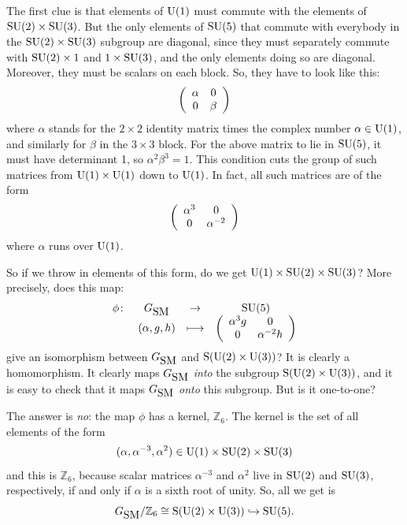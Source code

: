 \documentclass[12pt]{article}
\newcommand{\maps}{\colon}    %
\newcommand{\Z}{{\mathbb Z}}  %
\newcommand{\U}{{\rm U}}    %
\renewcommand{\S}{{\rm S}}    %
\newcommand{\SU}{{\rm SU}}    %
\newcommand{\inclusion}{\hookrightarrow}
\newcommand{\GSM}{{G_{\mbox{\rm SM}}}}  %
\begin{document}
The first clue is that elements of $\U(1)$ must commute with the
elements of $\SU(2) \times \SU(3)$.  But the only elements of $\SU(5)$
that commute with everybody in the $\SU(2) \times \SU(3)$ subgroup are
diagonal, since they must separately commute with $\SU(2) \times 1$
and $1 \times \SU(3)$, and the only elements doing so are
diagonal. Moreover, they must be scalars on each block.  So, they have
to look like this:
\[
\left( 
\begin{array}{c c}
\alpha & 0 \\
0      & \beta
\end{array}
\right)
\]
where $\alpha$ stands for the $2 \times 2$ identity matrix times
the complex number $\alpha \in \U(1)$, and similarly for $\beta$ in the
$3 \times 3$ block.  For the above matrix to lie in $\SU(5)$, it
must have determinant 1, so $\alpha^2 \beta^3 = 1$.  This condition 
cuts the group of such matrices from $\U(1) \times \U(1)$ down to 
$\U(1)$. In fact, all such matrices are of the form
\[
\left( 
\begin{array}{c c}
\alpha^3 & 0 \\
0        & \alpha^{-2}
\end{array}
\right)
\]
where $\alpha$ runs over $\U(1)$.

So if we throw in elements of this form, do we get $\U(1) \times
\SU(2) \times \SU(3)$?  More precisely, does this map:
\[ \begin{array}{rccc}
  \phi \maps & \GSM &\to& \SU(5) \\   
             & (\alpha, g, h) &\longmapsto& 
\left( 
\begin{array}{c c}
\alpha^{3}g & 0 \\
0           & \alpha^{-2}h
\end{array}
\right)
\end{array}
\]
give an isomorphism between $\GSM$ and $\S(\U(2) \times \U(3))$?
It is clearly a homomorphism.  It clearly maps 
$\GSM$ \emph{into} the subgroup $\S(\U(2) \times \U(3))$, and 
it is easy to check that it maps $\GSM$ \emph{onto} this subgroup.
But is it one-to-one?

The answer is \emph{no}: the map $\phi$ has a kernel, $\Z_6$.  
The kernel is the set of all elements of the form
\[ (\alpha, \alpha^{-3}, \alpha^2) \in \U(1) \times \SU(2) \times \SU(3) \]
and this is $\Z_6$, because scalar matrices $\alpha^{-3}$ and $\alpha^2$ live
in $\SU(2)$ and $\SU(3)$, respectively, if and only if $\alpha$ is a sixth root
of unity.  So, all we get is
\[  \GSM/\Z_6 \cong \S(\U(2) \times \U(3)) \inclusion \SU(5). \]
\end{document}

